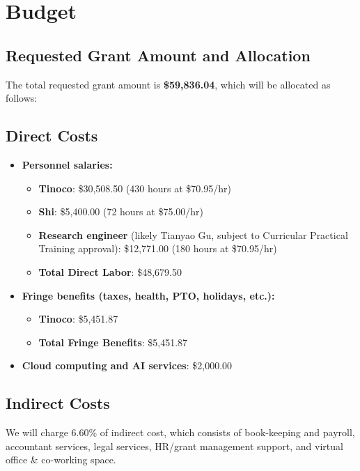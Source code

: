 \section{Budget}
\label{sec:budget}


\subsection*{Requested Grant Amount and Allocation}
The total requested grant amount is \textbf{\$59,836.04}, which will be allocated as follows:

\subsection*{Direct Costs}
\begin{itemize}
\item {\bf Personnel salaries:}
\begin{itemize}
    \item \textbf{Tinoco}: \$30,508.50 \quad (430 hours at \$70.95/hr)
    \item \textbf{Shi}: \$5,400.00 \quad (72 hours at \$75.00/hr)
    \item \textbf{Research engineer} (likely Tianyao Gu, subject to
      Curricular Practical Training approval): \$12,771.00 \quad (180 hours
      at \$70.95/hr)
    \item \textbf{Total Direct Labor}: \$48,679.50
\end{itemize}

\item \textbf{Fringe benefits (taxes, health, PTO, holidays, etc.):}
\begin{itemize}
    \item \textbf{Tinoco}: \$5,451.87
    \item \textbf{Total Fringe Benefits}: \$5,451.87
\end{itemize}

\item{\bf Cloud computing and AI services}: \$2,000.00
\end{itemize}

\subsection*{Indirect Costs}
We will charge 6.60\% of indirect cost, which consists of book-keeping and payroll, accountant services, legal services, HR/grant management support, and virtual office \& co-working space.

